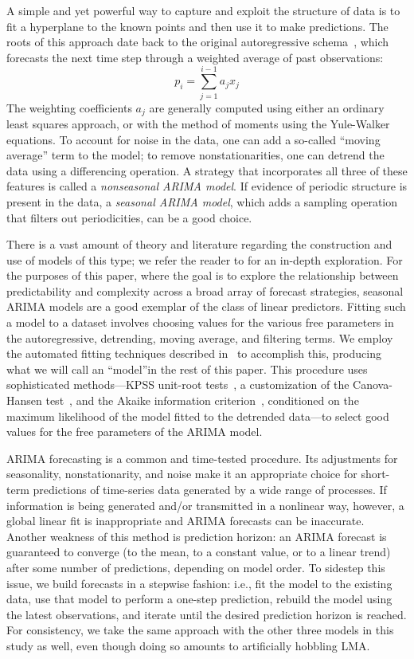 A simple and yet powerful way to capture and exploit the structure of
data is to fit a hyperplane to the known points and then use it to
make predictions.  The roots of this approach date back to the
original autoregressive schema~\cite{weigend93}, which forecasts the
next time step through a weighted average of past observations: $$p_i
= \sum_{j=1}^{i-1} a_j x_j$$ The weighting coefficients $a_j$ are
generally computed using either an ordinary least squares approach, or
with the method of moments using the Yule-Walker equations.  To
account for noise in the data, one can add a so-called ``moving
average'' term to the model; to remove nonstationarities, one can
detrend the data using a differencing operation.  A strategy that
incorporates all three of these features is called a \emph{nonseasonal
  ARIMA model}.  If evidence of periodic structure is present in the
data, a \emph{seasonal ARIMA model}, which adds a sampling operation
that filters out periodicities, can be a good choice.

There is a vast amount of theory and literature regarding the
construction and use of models of this type; we refer the reader to
\cite{davislinearts} for an in-depth exploration.  For the purposes of
this paper, where the goal is to explore the relationship between
predictability and complexity across a broad array of forecast
strategies, seasonal ARIMA models are a good exemplar of the class of
linear predictors.  Fitting such a model to a dataset involves
choosing values for the various free parameters in the autoregressive,
detrending, moving average, and filtering terms.  We employ the
automated fitting techniques described in~\cite{autoARIMA} to
accomplish this, producing what we will call an ``\arima model''in the
rest of this paper.  This procedure uses sophisticated methods---KPSS
unit-root tests~\cite{KPSSunit}, a customization of the Canova-Hansen
test~\cite{Canova1995}, and the Akaike information
criterion~\cite{akaike1974}, conditioned on the maximum likelihood of
the model fitted to the detrended data---to select good values for the
free parameters of the ARIMA model.

ARIMA forecasting is a common and time-tested procedure.  Its
adjustments for seasonality, nonstationarity, and noise make it an
appropriate choice for short-term predictions of time-series data
generated by a wide range of processes.  If information is being
generated and/or transmitted in a nonlinear way, however, a global
linear fit is inappropriate and ARIMA forecasts can be inaccurate.
Another weakness of this method is prediction horizon: an ARIMA
forecast is guaranteed to converge (to the mean, to a constant value,
or to a linear trend) after some number of predictions, depending on
model order.  To sidestep this issue, we build forecasts in a stepwise
fashion: i.e., fit the \arima model to the existing data, use that
model to perform a one-step prediction, rebuild the \arima model using
the latest observations, and iterate until the desired prediction
horizon is reached.  For consistency, we take the same approach with
the other three models in this study as well, even though doing so
amounts to artificially hobbling LMA.

